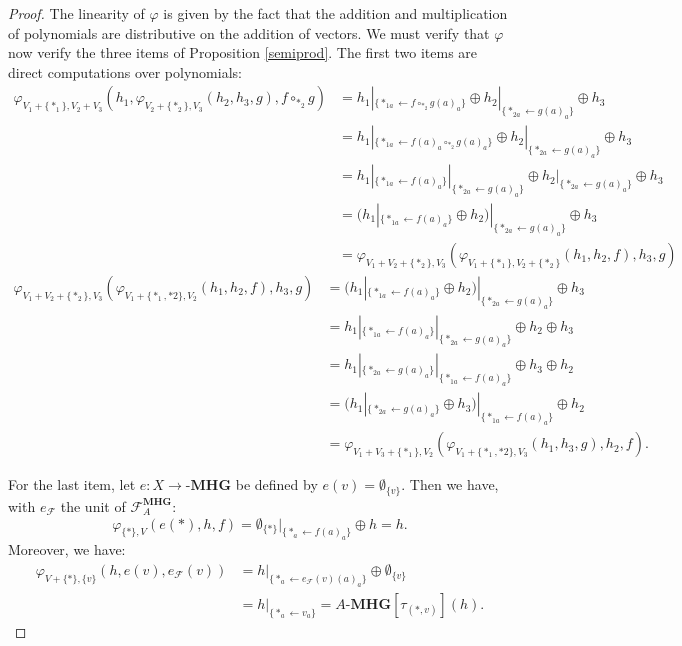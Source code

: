 \documentclass[a4paper]{article}
\theoremstyle{definition}
\newcommand{\MHG}{\mathbf{MHG}}
\begin{document}
\begin{proof}
The linearity of $\varphi$ is given by the fact that the addition and multiplication of
 polynomials are distributive on the addition of vectors. We must verify that $\varphi$ 
 now verify the three items of Proposition \ref{semiprod}. The first two items are direct computations over polynomials:
\begin{equation}\begin{split}
	\varphi_{V_1+\{\ast_1\},V_2+V_3}(h_1,\varphi_{V_2+\{\ast_2\},V_3}(h_2,h_3,g),f\circ_{\ast_2}g) 
	&= h_1|_{\{\ast_{1a}\leftarrow f\circ_{\ast_2} g(a)_a\}}\oplus h_2|_{\{\ast_{2a}\leftarrow g(a)_a\}}\oplus h_3 \\
	&= h_1|_{\{\ast_{1a}\leftarrow f(a)_a\circ_{\ast_2} g(a)_a\}}\oplus h_2|_{\{\ast_{2a}\leftarrow g(a)_a\}}\oplus h_3 \\
	&= h_1|_{\{\ast_{1a}\leftarrow f(a)_a\}}|_{\{\ast_{2a}\leftarrow g(a)_a\}}\oplus h_2|_{\{\ast_{2a}\leftarrow g(a)_a\}}\oplus h_3 \\
	&= (h_1|_{\{\ast_{1a}\leftarrow f(a)_a\}}\oplus h_2)|_{\{\ast_{2a}\leftarrow g(a)_a\}}\oplus h_3 \\
	&=\varphi_{V_1+V_2+\{\ast_2\},V_3}(\varphi_{V_1+\{\ast_1\},V_2+\{\ast_2\}}(h_1,h_2,f),h_3,g)
\end{split}\end{equation}
\begin{equation}\begin{split}
	\varphi_{V_1+V_2+\{\ast_2\},V_3}(\varphi_{V_1+\{\ast_1,\ast2\},V_2}(h_1,h_2,f),h_3,g) 
	&= (h_1|_{\{\ast_{1a}\leftarrow f(a)_a\}}\oplus h_2)|_{\{\ast_{2a}\leftarrow g(a)_a\}}\oplus h_3 \\
	&= h_1|_{\{\ast_{1a}\leftarrow f(a)_a\}}|_{\{\ast_{2a}\leftarrow g(a)_a\}}\oplus h_2\oplus h_3 \\
	&= h_1|_{\{\ast_{2a}\leftarrow g(a)_a\}}|_{\{\ast_{1a}\leftarrow f(a)_a\}}\oplus h_3\oplus h_2 \\
	&= (h_1|_{\{\ast_{2a}\leftarrow g(a)_a\}}\oplus h_3)|_{\{\ast_{1a}\leftarrow f(a)_a\}}\oplus h_2 \\
	&= \varphi_{V_1+V_3+\{\ast_1\},V_2}(\varphi_{V_1+\{\ast_1,\ast2\},V_3}(h_1,h_3,g),h_2,f).
\end{split}\end{equation}

For the last item, let $e: X\rightarrow \text{-}\MHG$ be defined by $e(v) = \emptyset_{\{v\}}$. 
Then we have, with $e_{\mathcal{F}}$ the unit of $\mathcal{F}_A^{\MHG}$:
\begin{equation}
	\varphi_{\{\ast\},V}(e(\ast),h,f) = \emptyset_{\{\ast\}}|_{\{\ast_a \leftarrow f(a)_a\}}\oplus h = h.
\end{equation}
Moreover, we have:
\begin{equation}\begin{split}
	\varphi_{V+\{\ast\}, \{v\}}(h,e(v),e_{\mathcal{F}}(v)) 
	&= h|_{\{\ast_a \leftarrow e_{\mathcal{F}}(v)(a)_a\}}\oplus\emptyset_{\{v\}} \\
	&= h|_{\{\ast_a \leftarrow v_a\}} = A\text{-}\MHG[\tau_{(\ast,v)}](h).
\end{split}\end{equation}


\end{proof}
\end{document}
